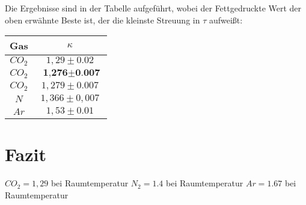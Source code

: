 \documentclass[%
   final,      %
   paper=a4, paper=portrait, pagesize=auto, %
   fontsize=11pt, %
   ngerman, %
 ]{scrartcl} %
\begin{document}
Die Ergebnisse sind in der Tabelle aufgeführt, wobei der Fettgedruckte Wert der oben erwähnte Beste ist, der die kleinste Streuung in $\tau$ aufweißt:

\vspace{0,5 cm}
\begin{tabular}{|c|c|}
\hline 
Gas & $\kappa$ \\ 
\hline 
$CO_2$ & $1,29 \pm 0.02$ \\ 
\hline 
$CO_2$ &  $\textbf{ 1,276} \pm \textbf{0.007}$ \\ 
\hline 
$CO_2$ & $1,279 \pm 0.007$ \\ 
\hline 
$N$ & $1,366\pm 0,007$  \\ 
\hline
$Ar$ & $1,53\pm 0.01$ \\
\hline 
\end{tabular} 
\section{Fazit}
$CO_2 = 1,29$ bei Raumtemperatur
$N_2 = 1.4$ bei Raumtemperatur
$Ar = 1.67$ bei Raumtemperatur
\end{document}
